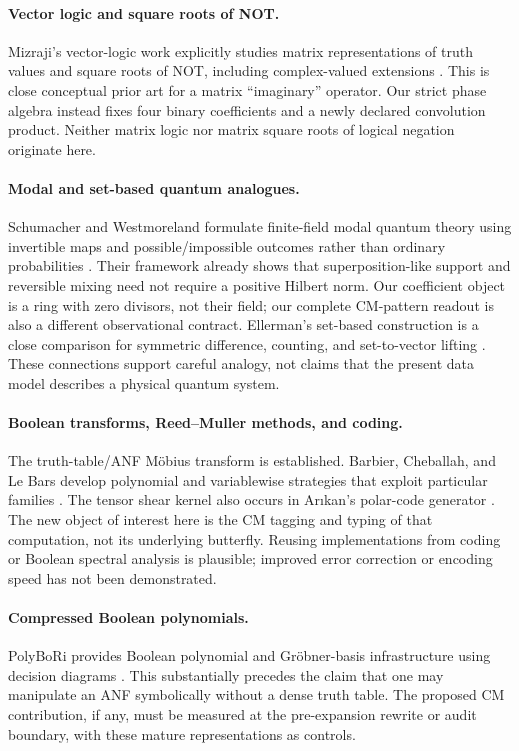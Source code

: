 \documentclass[11pt,a4paper]{article}
\theoremstyle{definition}\newtheorem{definition}[theorem]{Definition}
\theoremstyle{remark}\newtheorem{remark}[theorem]{Remark}
\numberwithin{equation}{section}
\begin{document}
\paragraph{Vector logic and square roots of NOT.}
Mizraji's vector-logic work explicitly studies matrix representations of truth values and square roots of NOT, including complex-valued extensions \cite{mizraji,mizrajiroots}. This is close conceptual prior art for a matrix ``imaginary'' operator. Our strict phase algebra instead fixes four binary coefficients and a newly declared convolution product. Neither matrix logic nor matrix square roots of logical negation originate here.

\paragraph{Modal and set-based quantum analogues.}
Schumacher and Westmoreland formulate finite-field modal quantum theory using invertible maps and possible/impossible outcomes rather than ordinary probabilities \cite{modal}. Their framework already shows that superposition-like support and reversible mixing need not require a positive Hilbert norm. Our coefficient object is a ring with zero divisors, not their field; our complete CM-pattern readout is also a different observational contract. Ellerman's set-based construction is a close comparison for symmetric difference, counting, and set-to-vector lifting \cite{ellerman}. These connections support careful analogy, not claims that the present data model describes a physical quantum system.

\paragraph{Boolean transforms, Reed--Muller methods, and coding.}
The truth-table/ANF M\"obius transform is established. Barbier, Cheballah, and Le Bars develop polynomial and variablewise strategies that exploit particular families \cite{barbier}. The tensor shear kernel also occurs in Ar\i kan's polar-code generator \cite{arikan}. The new object of interest here is the CM tagging and typing of that computation, not its underlying butterfly. Reusing implementations from coding or Boolean spectral analysis is plausible; improved error correction or encoding speed has not been demonstrated.

\paragraph{Compressed Boolean polynomials.}
PolyBoRi provides Boolean polynomial and Gr\"obner-basis infrastructure using decision diagrams \cite{polybori,polyboridoc}. This substantially precedes the claim that one may manipulate an ANF symbolically without a dense truth table. The proposed CM contribution, if any, must be measured at the pre-expansion rewrite or audit boundary, with these mature representations as controls.
\end{document}
